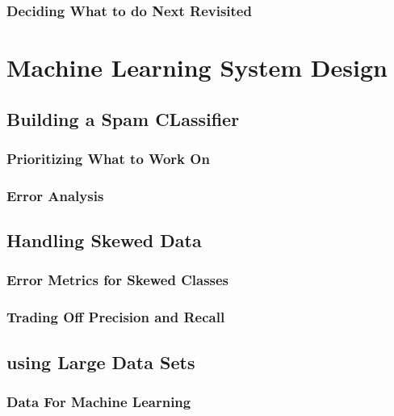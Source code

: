 \documentclass{article}
\begin{document}
\subsubsection{Deciding What to do Next Revisited}


\section{Machine Learning System Design}
\subsection{Building a Spam CLassifier}
\subsubsection{Prioritizing What to Work On}
\subsubsection{Error Analysis}
\subsection{Handling Skewed Data}
\subsubsection{Error Metrics for Skewed Classes}
\subsubsection{Trading Off Precision and Recall}
\subsection{using Large Data Sets}
\subsubsection{Data For Machine Learning}
\end{document}
